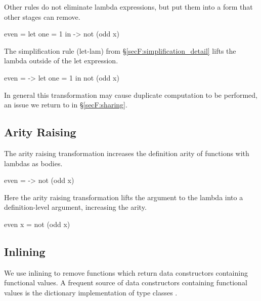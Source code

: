\noindent Other rules do not eliminate lambda expressions, but put them into a form that other stages can remove.

\begin{example}
\begin{code}
even =  let  one = 1
        in   \x -> not (odd x)
\end{code}

\noindent The simplification rule (let-lam) from \S\ref{secF:simplification_detail} lifts the lambda outside of the let expression.

\begin{code}
even = \x ->  let  one = 1
              in   not (odd x)
\end{code}

\noindent In general this transformation may cause duplicate computation to be performed, an issue we return to in \S\ref{secF:sharing}.
\end{example}


\subsection{Arity Raising}

The arity raising transformation increases the definition arity of functions with lambdas as bodies.

\begin{example}
\begin{code}
even = \x -> not (odd x)
\end{code}

\noindent Here the arity raising transformation lifts the argument to the lambda into a definition-level argument, increasing the arity.

\begin{code}
even x = not (odd x)
\end{code}
\end{example}


\subsection{Inlining}

We use inlining to remove functions which return data constructors containing functional values. A frequent source of data constructors containing functional values is the dictionary implementation of type classes \cite{wadler:type_classes}.


